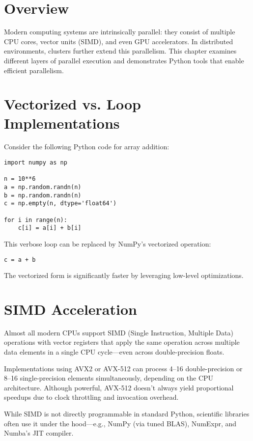 \documentclass{book}
\begin{document}
\section*{Overview}
Modern computing systems are intrinsically parallel: they consist of multiple CPU cores, vector units (SIMD), and even GPU accelerators. In distributed environments, clusters further extend this parallelism. This chapter examines different layers of parallel execution and demonstrates Python tools that enable efficient parallelism.

\section{Vectorized vs. Loop Implementations}
Consider the following Python code for array addition:

\begin{lstlisting}
import numpy as np

n = 10**6
a = np.random.randn(n)
b = np.random.randn(n)
c = np.empty(n, dtype='float64')

for i in range(n):
    c[i] = a[i] + b[i]
\end{lstlisting}

This verbose loop can be replaced by NumPy's vectorized operation:

\begin{lstlisting}
c = a + b
\end{lstlisting}

The vectorized form is significantly faster by leveraging low-level optimizations.

\section{SIMD Acceleration}

Almost all modern CPUs support SIMD (Single Instruction, Multiple Data) operations with vector registers that apply the same operation across multiple data elements in a single CPU cycle—even across double-precision floats.

Implementations using AVX2 or AVX-512 can process 4–16 double-precision or 8–16 single-precision elements simultaneously, depending on the CPU architecture. Although powerful, AVX-512 doesn't always yield proportional speedups due to clock throttling and invocation overhead.

While SIMD is not directly programmable in standard Python, scientific libraries often use it under the hood—e.g., NumPy (via tuned BLAS), NumExpr, and Numba's JIT compiler.
\end{document}
